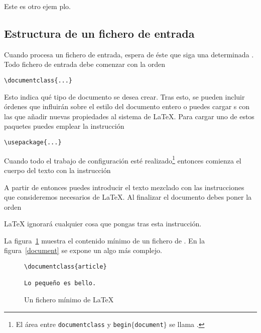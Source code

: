 \begin{example}
Este es otro ejem%
plo.
\end{example}

\subsection{Estructura de un fichero de entrada}

Cuando \LaTeXe{}  procesa un  fichero de entrada,  espera de  éste que
siga  una determinada  . Todo  fichero de  entrada debe
comenzar con la orden

\begin{code}
\verb|\documentclass{...}|
\end{code}

Esto indica qué tipo de documento se desea crear. Tras esto, se pueden
incluir órdenes que  influirán sobre el estilo del  documento entero o
puedes cargar s  con las que añadir  nuevas propiedades al
sistema de \LaTeX. Para cargar uno de estos paquetes puedes emplear la
instrucción \begin{code} \verb|\usepackage{...}| \end{code}

Cuando     todo      el     trabajo     de      configuración     esté
realizado\footnote{El   área   entre  \texttt{\bs   documentclass}   y
\texttt{\bs    begin$\mathtt{\{}$document$\mathtt{\}}$}    se    llama
\emph{}.} entonces  comienza el cuerpo del  texto con la
instrucción

\begin{code}
\verb||
\end{code}

A  partir de  entonces puedes  introducir  el texto  mezclado con  las
instrucciones que  consideremos necesarios de \LaTeX.  Al finalizar el
documento debes poner la orden

\begin{code}
\verb||
\end{code}

LaTeX{} ignorará cualquier cosa que pongas tras esta instrucción.

La  figura~\ref{mini} muestra  el contenido  mínimo de  un fichero  de
\LaTeXe.  En  la figura~\ref{document}  se  expone  un  algo más complejo.

\begin{figure}[!bp]
\begin{lined}{6cm}
\begin{verbatim}
\documentclass{article}

Lo pequeño es bello.

\end{verbatim}
\end{lined}
\caption{Un fichero mínimo de \LaTeX} \label{mini}
\end{figure}
 
